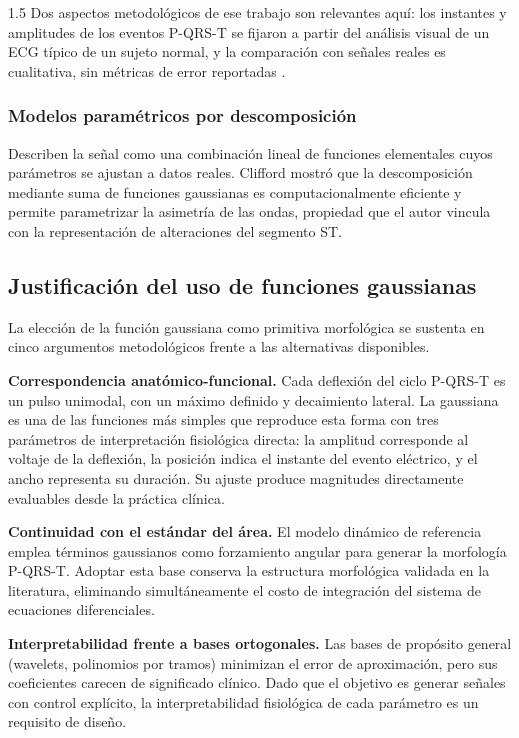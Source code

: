 \begin{spacing}{1.5}
Dos aspectos metodológicos de ese trabajo son relevantes aquí: los instantes y amplitudes de los eventos P-QRS-T se fijaron a partir del análisis visual de un ECG típico de un sujeto normal, y la comparación con señales reales es cualitativa, sin métricas de error reportadas \cite{mcsharry2003dynamical}.

\subsubsection{Modelos paramétricos por descomposición}

Describen la señal como una combinación lineal de funciones elementales cuyos parámetros se ajustan a datos reales. Clifford \cite{clifford2004model} mostró que la descomposición mediante suma de funciones gaussianas es computacionalmente eficiente y permite parametrizar la asimetría de las ondas, propiedad que el autor vincula con la representación de alteraciones del segmento ST.

\subsection{Justificación del uso de funciones gaussianas}

La elección de la función gaussiana como primitiva morfológica se sustenta en cinco argumentos metodológicos frente a las alternativas disponibles.

\textbf{Correspondencia anatómico-funcional.} Cada deflexión del ciclo P-QRS-T es un pulso unimodal, con un máximo definido y decaimiento lateral. La gaussiana es una de las funciones más simples que reproduce esta forma con tres parámetros de interpretación fisiológica directa: la amplitud corresponde al voltaje de la deflexión, la posición indica el instante del evento eléctrico, y el ancho representa su duración. Su ajuste produce magnitudes directamente evaluables desde la práctica clínica.

\textbf{Continuidad con el estándar del área.} El modelo dinámico de referencia \cite{mcsharry2003dynamical} emplea términos gaussianos como forzamiento angular para generar la morfología P-QRS-T. Adoptar esta base conserva la estructura morfológica validada en la literatura, eliminando simultáneamente el costo de integración del sistema de ecuaciones diferenciales.

\textbf{Interpretabilidad frente a bases ortogonales.} Las bases de propósito general (wavelets, polinomios por tramos) minimizan el error de aproximación, pero sus coeficientes carecen de significado clínico. Dado que el objetivo es generar señales con control explícito, la interpretabilidad fisiológica de cada parámetro es un requisito de diseño.


\end{spacing}
